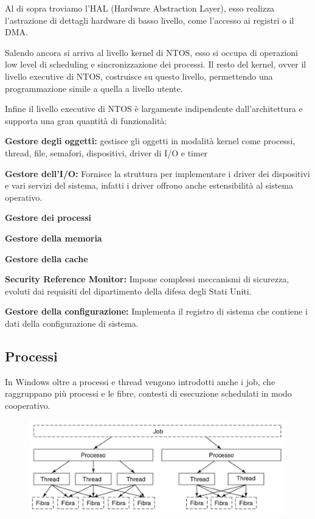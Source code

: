 \spacer
Al di sopra troviamo l'HAL (Hardware Abstraction Layer), esso realizza l'astrazione di dettagli hardware di basso livello, come l'accesso ai registri o il DMA.

\spacer
Salendo ancora si arriva al livello kernel di NTOS, esso si occupa di operazioni low level di scheduling e sincronizzazione dei processi. Il resto del kernel, ovver il livello executive di NTOS, costruisce su questo livello, permettendo una programmazione simile a quella a livello utente.

\spacer
Infine il livello executive di NTOS è largamente indipendente dall'architettura e supporta una gran quantità di funzionalità:
\begin{sitemize}
    \item \textbf{Gestore degli oggetti:} gestisce gli oggetti in modalità kernel come processi, thread, file, semafori, dispositivi, driver di I/O e timer
    \item \textbf{Gestore dell'I/O:} Fornisce la struttura per implementare i driver dei dispositivi e vari servizi del sistema, infatti i driver offrono anche estensibilità al sistema operativo.
    \item \textbf{Gestore dei processi}
    \item \textbf{Gestore della memoria}
    \item \textbf{Gestore della cache}
    \item \textbf{Security Reference Monitor:} Impone complessi meccanismi di sicurezza, evoluti dai requisiti del dipartimento della difesa degli Stati Uniti.
    \item \textbf{Gestore della configurazione:} Implementa il registro di sistema che contiene i dati della configurazione di sistema.
\end{sitemize}

\subsection{Processi}

In Windows oltre a processi e thread vengono introdotti anche i job, che raggruppano più processi e le fibre, contesti di esecuzione schedulati in modo cooperativo.

\begin{figure}[H]
    \centering
    \includegraphics[width=0.75\linewidth]{assets/Windows-job.jpeg}
\end{figure}

